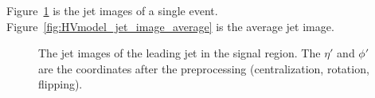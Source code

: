 \documentclass[12pt]{article}
\begin{document}
        Figure~\ref{fig:HVmodel_jet_image_one_event} is the jet images of a single event. Figure~\ref{fig:HVmodel_jet_image_average} is the average jet image.

        \begin{figure}[htpb]
            \centering
            \caption{The jet images of the leading jet in the signal region. The $\eta'$ and $\phi'$ are the coordinates after the preprocessing (centralization, rotation, flipping).}
            \label{fig:HVmodel_jet_image_one_event}
        \end{figure}
\end{document}
